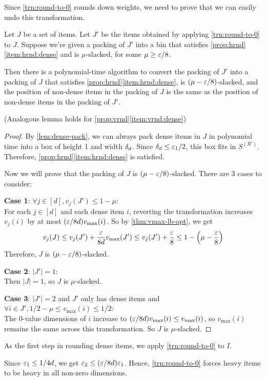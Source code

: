 Since \cref{trn:round-to-0} rounds down weights,
we need to prove that we can easily undo this transformation.
\begin{lemma}
\label{lem:round-to-0}
Let $J$ be a set of items.
Let $J'$ be the items obtained by applying \cref{trn:round-to-0} to $J$.
Suppose we're given a packing of $J'$ into a bin that satisfies
\cref{prop:hrnd}\ref{item:hrnd:dense} and is $\mu$-slacked, for some $\mu \ge \varepsilon/8$.

Then there is a polynomial-time algorithm to convert the packing of $J'$
into a packing of $J$ that satisfies \cref{prop:hrnd}\ref{item:hrnd:dense},
is $(\mu - \varepsilon/8)$-slacked, and the position of non-dense items in the packing of $J$
is the same as the position of non-dense items in the packing of $J'$.
\end{lemma}
(Analogous lemma holds for \cref{prop:vrnd}\ref{item:vrnd:dense})
\begin{proof}
By \cref{lem:dense-pack}, we can always pack dense items in $J$ in polynomial time
into a box of height 1 and width $\delta_d$.
Since $\delta_d \le \varepsilon_1/2$, this box fits in $S^{(R')}$.
Therefore, \cref{prop:hrnd}\ref{item:hrnd:dense} is satisfied.

Now we will prove that the packing of $J$ is $(\mu - \varepsilon/8)$-slacked.
There are 3 cases to consider:

\textbf{Case 1}: $\forall j \in [d], v_j(J') \le 1-\mu$:\\
For each $j \in [d]$ and each dense item $i$,
reverting the transformation increases $v_j(i)$ by at most $(\varepsilon/8d) v_{\max}(i)$.
So by \cref{thm:vmax-lb-opt}, we get
\[ v_j(J) \le v_j(J') + \frac{\varepsilon}{8d} v_{\max}(J')
\le v_j(J') + \frac{\varepsilon}{8} \le 1 - \left(\mu - \frac{\varepsilon}{8}\right) \]
Therefore, $J$ is $(\mu - \varepsilon/8)$-slacked.

\textbf{Case 2}: $|J'| = 1$:\\
Then $|J|=1$, so $J$ is $\mu$-slacked.

\textbf{Case 3}: $|J'| = 2$ and $J'$ only has dense items
and $\forall i \in J', 1/2 - \mu \le v_{\max}(i) \le 1/2$:\\
The 0-value dimensions of $i$ increase to $(\varepsilon/8d) v_{\max}(i) \le v_{\max}(i)$,
so $v_{\max}(i)$ remains the same across this transformation. So $J$ is $\mu$-slacked.
\end{proof}

As the first step in rounding dense items, we apply \cref{trn:round-to-0} to $I$.

Since $\varepsilon_1 \le 1/4d$, we get $\varepsilon_2 \le (\varepsilon/8d)\varepsilon_1$.
Hence, \cref{trn:round-to-0} forces heavy items to be heavy in all non-zero dimensions.

